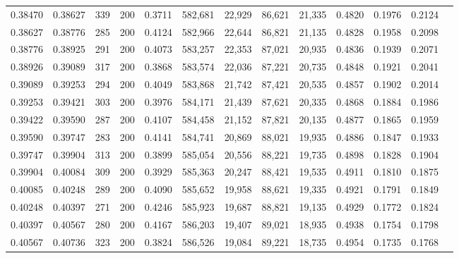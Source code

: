 \begin{tabular}{rrrrrrrrrrrrr}
0.38470 & 0.38627 &    339 & 200 &                                     0.3711 & 582,681 &  22,929 &  86,621 &  21,335 & 0.4820 & 0.1976 & 0.2124 \\
0.38627 & 0.38776 &    285 & 200 &                                     0.4124 & 582,966 &  22,644 &  86,821 &  21,135 & 0.4828 & 0.1958 & 0.2098 \\
0.38776 & 0.38925 &    291 & 200 &                                     0.4073 & 583,257 &  22,353 &  87,021 &  20,935 & 0.4836 & 0.1939 & 0.2071 \\
0.38926 & 0.39089 &    317 & 200 &                                     0.3868 & 583,574 &  22,036 &  87,221 &  20,735 & 0.4848 & 0.1921 & 0.2041 \\
0.39089 & 0.39253 &    294 & 200 &                                     0.4049 & 583,868 &  21,742 &  87,421 &  20,535 & 0.4857 & 0.1902 & 0.2014 \\
0.39253 & 0.39421 &    303 & 200 &                                     0.3976 & 584,171 &  21,439 &  87,621 &  20,335 & 0.4868 & 0.1884 & 0.1986 \\
0.39422 & 0.39590 &    287 & 200 &                                     0.4107 & 584,458 &  21,152 &  87,821 &  20,135 & 0.4877 & 0.1865 & 0.1959 \\
0.39590 & 0.39747 &    283 & 200 &                                     0.4141 & 584,741 &  20,869 &  88,021 &  19,935 & 0.4886 & 0.1847 & 0.1933 \\
0.39747 & 0.39904 &    313 & 200 &                                     0.3899 & 585,054 &  20,556 &  88,221 &  19,735 & 0.4898 & 0.1828 & 0.1904 \\
0.39904 & 0.40084 &    309 & 200 &                                     0.3929 & 585,363 &  20,247 &  88,421 &  19,535 & 0.4911 & 0.1810 & 0.1875 \\
0.40085 & 0.40248 &    289 & 200 &                                     0.4090 & 585,652 &  19,958 &  88,621 &  19,335 & 0.4921 & 0.1791 & 0.1849 \\
0.40248 & 0.40397 &    271 & 200 &                                     0.4246 & 585,923 &  19,687 &  88,821 &  19,135 & 0.4929 & 0.1772 & 0.1824 \\
0.40397 & 0.40567 &    280 & 200 &                                     0.4167 & 586,203 &  19,407 &  89,021 &  18,935 & 0.4938 & 0.1754 & 0.1798 \\
0.40567 & 0.40736 &    323 & 200 &                                     0.3824 & 586,526 &  19,084 &  89,221 &  18,735 & 0.4954 & 0.1735 & 0.1768 \\

\end{tabular}
